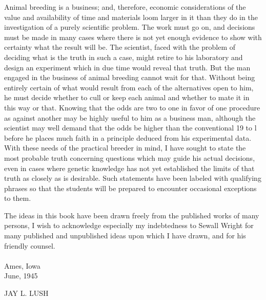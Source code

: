 \documentclass[letterpaper, 12pt, onecolumn]{book}
\begin{document}
Animal breeding is a business; and, therefore, economic considerations of the value and availability of time and materials 
loom larger in it than they do in the investigation of a purely scientific problem. The work must go on, and decisions 
must be made in many cases where there is not yet enough evidence to show with certainty what the result will be. The 
scientist, faced with the problem of deciding what is the truth in such a case, might retire to his laboratory and design 
an experiment which in due time would reveal that truth. But the man engaged in the business of animal breeding cannot 
wait for that. Without being entirely certain of what would result from each of the alternatives open to him, he must 
decide whether to cull or keep each animal and whether to mate it in this way or that. Knowing that the odds are two to 
one in favor of one procedure as against another may be highly useful to him as a business man, although the scientist 
may well demand that the odds be higher than the conventional 19 to l before he places much faith in a principle deduced 
from his experimental data. With these needs of the practical breeder in mind, I have sought to state the most probable 
truth concerning questions which may guide his actual decisions, even in cases where genetic knowledge has not yet 
established the limits of that truth as closely as is desirable. Such statements have been labeled with qualifying phrases 
so that the students will be prepared to encounter occasional exceptions to them.

The ideas in this book have been drawn freely from the published works of many persons, I wish to acknowledge especially my indebtedness to Sewall Wright for many published and unpublished ideas upon which I have drawn, and for his friendly counsel.\\
~\\
Ames, Iowa\\
June, 1945\\
\begin{flushright}
	JAY L. LUSH
\end{flushright}

\tableofcontents

\mainmatter












\end{document}
